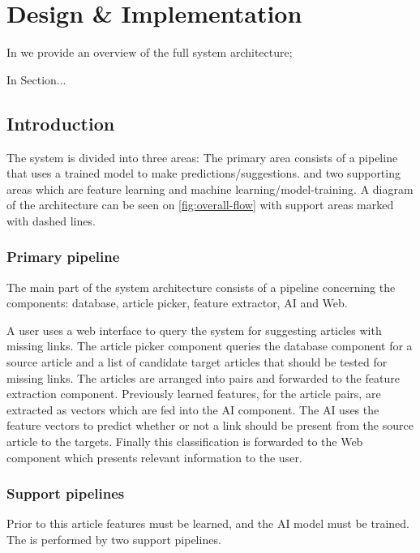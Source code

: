 \chapter{Design \& Implementation}\label{chap:design}

\begin{chapterorganization}
  \item In  we provide an overview of the full system architecture;
  \item In Section...
\end{chapterorganization}

\section{Introduction}
The system is divided into three areas: The primary area consists of a pipeline that uses a trained model to make predictions/suggestions.
and two supporting areas which are feature learning and machine learning/model-training. A diagram of the architecture can be seen on \ref{fig:overall-flow} with support areas marked with dashed lines.


\subsection{Primary pipeline}
The main part of the system architecture consists of a pipeline concerning the components: database, article picker, feature extractor, AI and Web.

A user uses a web interface to query the system for suggesting articles with missing links.
The article picker component queries the database component for a source article and a list of candidate target articles that should be tested for missing links. The articles are arranged into pairs and forwarded to the feature extraction component. Previously learned features, for the article pairs, are extracted as vectors which are fed into the AI component. The AI uses the feature vectors to predict whether or not a link should be present from the source article to the targets. Finally this classification is forwarded to the Web component which presents relevant information to the user.

\subsection{Support pipelines}
Prior to this article features must be learned, and the AI model must be trained. The is performed by two support pipelines.

